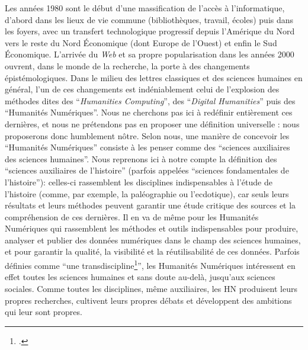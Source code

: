 Les années 1980 sont le début d'une massification de l'accès à l'informatique, d'abord dans les lieux de vie commune (bibliothèques, travail, écoles) puis dans les foyers, avec un transfert technologique progressif depuis l'Amérique du Nord vers le reste du Nord Économique (dont Europe de l'Ouest) et enfin le Sud Économique. L'arrivée du \textit{Web} et sa propre popularisation dans les années 2000 ouvrent, dans le monde de la recherche, la porte à des changements épistémologiques. Dans le milieu des lettres classiques et des sciences humaines en général, l'un de ces changements est indéniablement celui de l'explosion des méthodes dites des \enquote{\textit{Humanities Computing}}, des \enquote{\textit{Digital Humanities}} puis des \enquote{Humanités Numériques}. Nous ne cherchons pas ici à redéfinir entièrement ces dernières, et nous ne prétendons pas en proposer une définition universelle : nous proposerons donc humblement nôtre. Selon nous, une manière de concevoir les \enquote{Humanités Numériques} consiste à les penser comme des \enquote{sciences auxiliaires des sciences humaines}. Nous reprenons ici à notre compte la définition des \enquote{sciences auxiliaires de l'histoire} (parfois appelées \enquote{sciences fondamentales de l'histoire}): celles-ci rassemblent les disciplines indispensables à l'étude de l'histoire (comme, par exemple, la paléographie ou l'ecdotique), car seuls leurs résultats et leurs méthodes peuvent garantir une étude critique des sources et la compréhension de ces dernières. Il en va de même pour les Humanités Numériques qui rassemblent les méthodes et outils indispensables pour produire, analyser et publier des données numériques dans le champ des sciences humaines, et pour garantir la qualité, la visibilité et la réutilisabilité de ces données. Parfois définies comme \enquote{une transdiscipline\footcite{mounier_manifeste_2010}}, les Humanités Numériques intéressent en effet toutes les sciences humaines et sans doute au-delà, jusqu'aux sciences sociales. Comme toutes les disciplines, même auxiliaires, les HN produisent leurs propres recherches, cultivent leurs propres débats et développent des ambitions qui leur sont propres.


